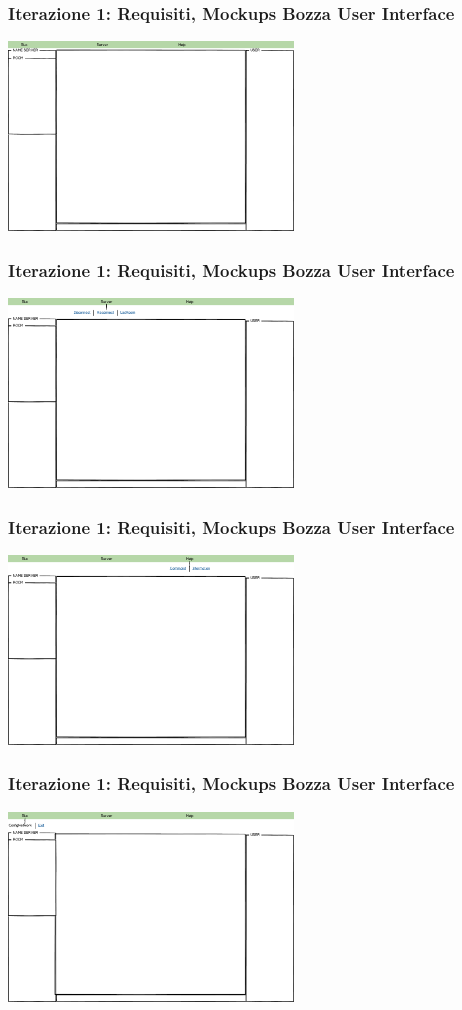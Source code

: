 \documentclass[t]{beamer} %
\begin{document}
\begin{frame}
 \frametitle{Iterazione 1: Requisiti, Mockups Bozza User Interface}
    \includegraphics[height=190px, width=286px,]{image_mockups/01_siuc_open.png}{\centering}
\end{frame}

\begin{frame}
 \frametitle{Iterazione 1: Requisiti, Mockups Bozza User Interface}
    \includegraphics[height=190px, width=286px,]{image_mockups/02_siuc_menu_server.png}{\centering}
\end{frame}

\begin{frame}
 \frametitle{Iterazione 1: Requisiti, Mockups Bozza User Interface}
    \includegraphics[height=190px, width=286px,]{image_mockups/03_siuc_menu_help.png}{\centering}
\end{frame}

\begin{frame}
 \frametitle{Iterazione 1: Requisiti, Mockups Bozza User Interface}
    \includegraphics[height=190px, width=286px,]{image_mockups/04_siuc_menu_siuc.png}{\centering}
\end{frame}
\end{document}
